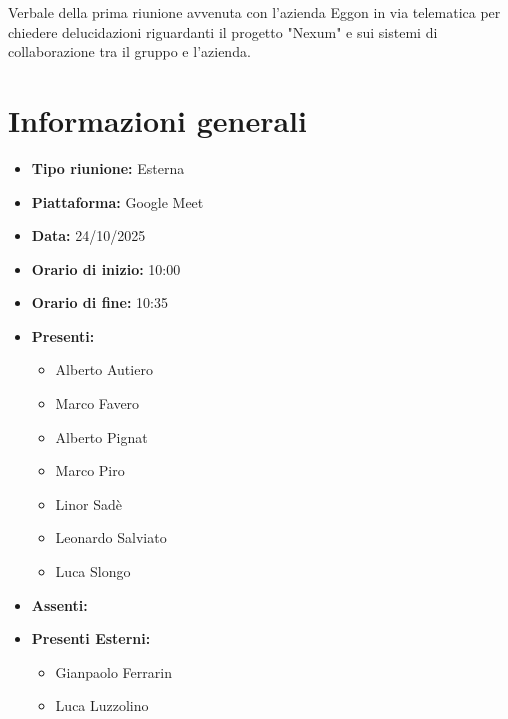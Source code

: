 \documentclass[a4paper,12pt]{article}
\begin{document}
\vspace{0.5cm}

\begin{center}
\begin{tcolorbox}[colback=secondaryblue!10,colframe=secondaryblue,width=0.9\textwidth,arc=3mm,boxrule=0.8pt,title={\bfseries Abstract}]
Verbale della prima riunione avvenuta con l'azienda Eggon in via telematica per chiedere delucidazioni riguardanti il progetto "Nexum" e sui sistemi di collaborazione tra il gruppo e l'azienda.
\end{tcolorbox}
\end{center}

\newpage

\tableofcontents
\newpage


\section{Informazioni generali}

\begin{itemize}
    \item \textbf{Tipo riunione:} Esterna
    \item \textbf{Piattaforma:} Google Meet
    \item \textbf{Data:} 24/10/2025
    \item \textbf{Orario di inizio:} 10:00
    \item \textbf{Orario di fine:} 10:35
    \item \textbf{Presenti:}
    \begin{itemize}[leftmargin=1.5em, itemsep=3pt, label={\rule[0.5ex]{0.4em}{0.4em}}]
        \item Alberto Autiero
        \item Marco Favero
        \item Alberto Pignat
        \item Marco Piro
        \item Linor Sadè
        \item Leonardo Salviato
        \item Luca Slongo
    \end{itemize}
    \item \textbf{Assenti:}
    \item \textbf{Presenti Esterni:}
    \begin{itemize}[leftmargin=1.5em, itemsep=3pt, label={\rule[0.5ex]{0.4em}{0.4em}}]
        \item Gianpaolo Ferrarin
        \item Luca Luzzolino
    \end{itemize}

\end{itemize}
\end{document}
